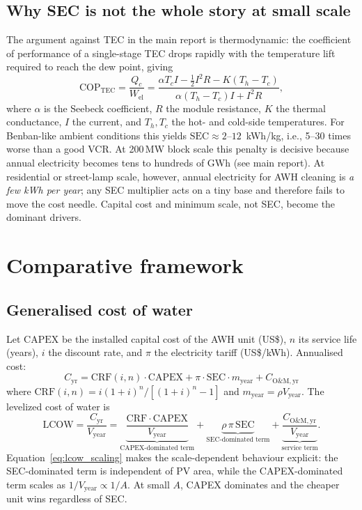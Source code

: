 \documentclass[11pt,a4paper]{article}
\begin{document}
\subsection{Why SEC is not the whole story at small scale}
The argument against TEC in the main report is thermodynamic: the coefficient of performance of a single-stage TEC drops rapidly with the temperature lift required to reach the dew point, giving
\begin{equation}
\mathrm{COP}_{\mathrm{TEC}}=\frac{Q_c}{W_{\mathrm{el}}}
=\frac{\alpha T_c I - \tfrac{1}{2}I^2 R - K(T_h-T_c)}{\alpha (T_h-T_c)I + I^2 R},
\end{equation}
where $\alpha$ is the Seebeck coefficient, $R$ the module resistance, $K$ the thermal conductance, $I$ the current, and $T_h, T_c$ the hot- and cold-side temperatures. For Benban-like ambient conditions this yields $\mathrm{SEC}\approx 2$--$12$~kWh/kg, i.e., 5--30 times worse than a good VCR. At 200\,MW block scale this penalty is decisive because annual electricity becomes tens to hundreds of GWh (see main report). At residential or street-lamp scale, however, annual electricity for AWH cleaning is \emph{a few kWh per year}; any SEC multiplier acts on a tiny base and therefore fails to move the cost needle. Capital cost and minimum scale, not SEC, become the dominant drivers.

\section{Comparative framework}
\subsection{Generalised cost of water}
Let $\mathrm{CAPEX}$ be the installed capital cost of the AWH unit (US\$), $n$ its service life (years), $i$ the discount rate, and $\pi$ the electricity tariff (US\$/kWh). Annualised cost:
\begin{equation}
C_{\mathrm{yr}}=\mathrm{CRF}(i,n)\cdot\mathrm{CAPEX}+\pi\cdot\mathrm{SEC}\cdot m_{\mathrm{year}}+C_{\mathrm{O\&M,yr}}
\end{equation}
where $\mathrm{CRF}(i,n)=i(1+i)^n/[(1+i)^n-1]$ and $m_{\mathrm{year}}=\rho V_{\mathrm{year}}$. The levelized cost of water is
\begin{equation}
\mathrm{LCOW}=\frac{C_{\mathrm{yr}}}{V_{\mathrm{year}}}
=\underbrace{\frac{\mathrm{CRF}\cdot\mathrm{CAPEX}}{V_{\mathrm{year}}}}_{\text{CAPEX-dominated term}}
+\underbrace{\rho\,\pi\,\mathrm{SEC}}_{\text{SEC-dominated term}}
+\underbrace{\frac{C_{\mathrm{O\&M,yr}}}{V_{\mathrm{year}}}}_{\text{service term}}.
\label{eq:lcow_scaling}
\end{equation}
Equation~\eqref{eq:lcow_scaling} makes the scale-dependent behaviour explicit: the SEC-dominated term is independent of PV area, while the CAPEX-dominated term scales as $1/V_{\mathrm{year}}\propto 1/A$. At small $A$, CAPEX dominates and the cheaper unit wins regardless of SEC.
\end{document}
